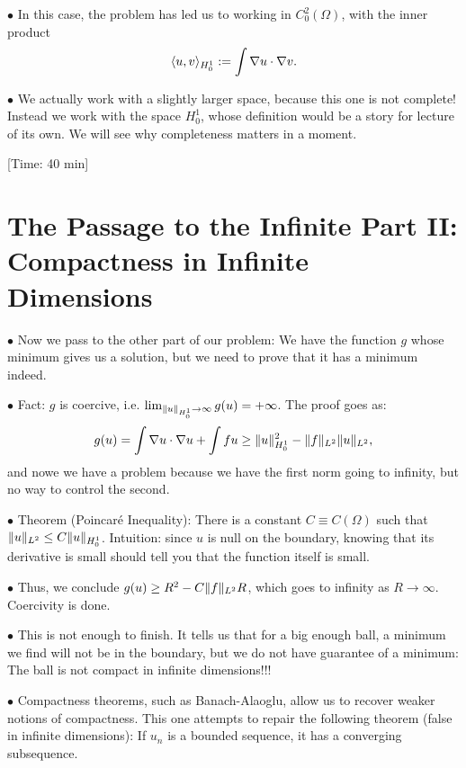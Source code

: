 \documentclass{article}
\DeclarePairedDelimiter{\braket}{\langle}{\rangle}
\DeclarePairedDelimiter{\norm}{\lVert}{\rVert}
\newcommand\point[1]{\noindent \hspace{\labelsep} $\bullet$ #1 \smallskip}
\newcommand\timestamp[1]{\noindent \hspace{\labelsep} [Time: #1] \smallskip}
\begin{document}
\point{In this case, the problem has led us to working in $C^2_0(\Omega)$, with the inner product
\begin{equation}
\braket{u,v}_{H^1_0} := \int \nabla u \cdot \nabla v.
\end{equation}}

\point{We actually work with a slightly larger space, because this one is not complete! Instead we work with the space $H^1_0$, whose definition would be a story for lecture of its own. We will see why completeness matters in a moment.}

\timestamp{40 min}

\section{The Passage to the Infinite Part II: Compactness in Infinite Dimensions}

\point{Now we pass to the other part of our problem: We have the function $g$ whose minimum gives us a solution, but we need to prove that it has a minimum indeed.}

\point{Fact: $g$ is coercive, i.e. $\lim_{\norm{u}_{H^1_0} \to \infty} g(u) = +\infty$. The proof goes as:
\begin{equation}
g(u) = \int \nabla u \cdot \nabla u + \int f u \geq \norm{u}_{H^1_0}^2 - \norm{f}_{L^2} \norm{u}_{L^2},
\end{equation}
and nowe we have a problem because we have the first norm going to infinity, but no way to control the second.}

\point{Theorem (Poincaré Inequality): There is a constant $C \equiv C(\Omega)$ such that $\norm{u}_{L^2} \leq C \norm{u}_{H^1_0}$. Intuition: since $u$ is null on the boundary, knowing that its derivative is small should tell you that the function itself is small.}

\point{Thus, we conclude $g(u) \geq R^2 - C \norm{f}_{L^2} R$, which goes to infinity as $R \to \infty$. Coercivity is done.}

\point{This is not enough to finish. It tells us that for a big enough ball, a minimum we find will not be in the boundary, but we do not have guarantee of a minimum: The ball is not compact in infinite dimensions!!!}

\point{Compactness theorems, such as Banach-Alaoglu, allow us to recover weaker notions of compactness. This one attempts to repair the following theorem (false in infinite dimensions): If $u_n$ is a bounded sequence, it has a converging subsequence.}
\end{document}
